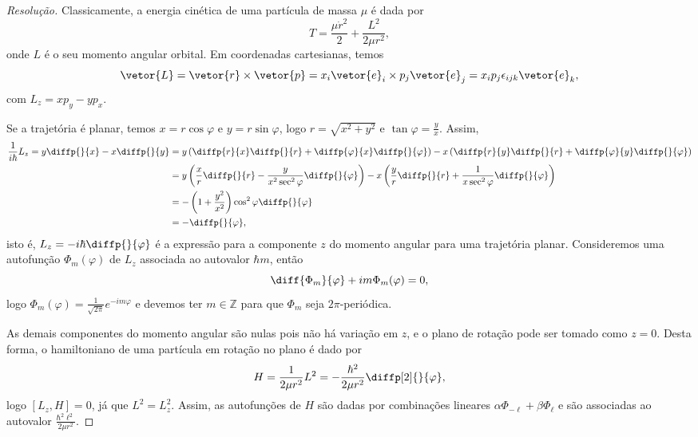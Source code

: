 \begin{proof}[Resolução]
    Classicamente, a energia cinética de uma partícula de massa \(\mu\) é dada por
    \begin{equation*}
        T = \frac{\mu \dot{r}^2}{2} + \frac{L^2}{2\mu r^2},
    \end{equation*}
    onde \(L\) é o seu momento angular orbital. Em coordenadas cartesianas, temos
    \begin{equation*}
        \vetor{L} = \vetor{r} \times \vetor{p} = x_i \vetor{e}_i \times p_j \vetor{e}_j = x_i  p_j \epsilon_{ijk}\vetor{e}_k,
    \end{equation*}
    com \(L_z = x p_y - y p_x\).

    Se a trajetória é planar, temos \(x = r\cos\varphi\) e \(y = r\sin\varphi\), logo \(r = \sqrt{x^2 + y^2}\) e \(\tan\varphi = \frac{y}{x}\). Assim,
    \begin{align*}
        \frac1{i\hbar}L_z = y \diffp{}{x} - x \diffp{}{y} &= y \left(\diffp{r}{x} \diffp{}{r} + \diffp{\varphi}{x}\diffp{}{\varphi}\right) - x \left(\diffp{r}{y} \diffp{}{r} + \diffp{\varphi}{y}\diffp{}{\varphi}\right)\\
                                                          &= y \left(\frac{x}{r}\diffp{}{r} - \frac{y}{x^2\sec^2\varphi} \diffp{}{\varphi}\right) - x \left(\frac{y}{r} \diffp{}{r} + \frac{1}{x\sec^2\varphi}\diffp{}{\varphi}\right)\\
                                                          &= -\left(1 + \frac{y^2}{x^2}\right)\cos^2\varphi \diffp{}{\varphi}\\
                                                          &= - \diffp{}{\varphi},
    \end{align*}
    isto é, \(L_z = -i \hbar \diffp{}{\varphi}\) é a expressão para a componente \(z\) do momento angular para uma trajetória planar. Consideremos uma autofunção \(\Phi_m(\varphi)\) de \(L_z\) associada ao autovalor \(\hbar m\), então
    \begin{equation*}
        \diff{\Phi_m}{\varphi} + i m \Phi_m(\varphi) = 0,
    \end{equation*}
    logo \(\Phi_m(\varphi) = \frac{1}{\sqrt{2\pi}} e^{-i m \varphi}\) e devemos ter \(m\in \mathbb{Z}\) para que \(\Phi_m\) seja \(2\pi\)-periódica.

    As demais componentes do momento angular são nulas pois não há variação em \(z\), e o plano de rotação pode ser tomado como \(z = 0\). Desta forma, o hamiltoniano de uma partícula em rotação no plano é dado por
    \begin{equation*}
        H = \frac{1}{2\mu r^2} L^2 = -\frac{\hbar^2}{2\mu r^2} \diffp[2]{}{\varphi},
    \end{equation*}
    logo \([L_z,H] = 0\), já que \(L^2 = L_z^2\). Assim, as autofunções de \(H\) são dadas por combinações lineares \(\alpha \Phi_{-\ell} + \beta \Phi_{\ell}\) e são associadas ao autovalor \(\frac{\hbar^2 \ell^2}{2\mu r^2}\).
\end{proof}
